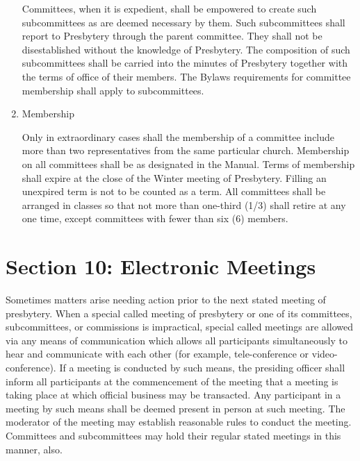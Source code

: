 \documentclass[
]{book}
\begin{document}
\begin{enumerate}
  Committees, when it is expedient, shall be empowered to create such subcommittees as are deemed necessary by them. Such subcommittees shall report to Presbytery through the parent committee. They shall not be disestablished without the knowledge of Presbytery. The composition of such subcommittees shall be carried into the minutes of Presbytery together with the terms of office of their members. The Bylaws requirements for committee membership shall apply to subcommittees.
\item
  Membership

  Only in extraordinary cases shall the membership of a committee include more than two representatives from the same particular church. Membership on all committees shall be as designated in the Manual. Terms of membership shall expire at the close of the Winter meeting of Presbytery. Filling an unexpired term is not to be counted as a term. All committees shall be arranged in classes so that not more than one-third (1/3) shall retire at any one time, except committees with fewer than six (6) members.
\end{enumerate}

\hypertarget{section-10-electronic-meetings}{%
\section*{Section 10: Electronic Meetings}\label{section-10-electronic-meetings}}

Sometimes matters arise needing action prior to the next stated meeting of presbytery. When a special called meeting of presbytery or one of its committees, subcommittees, or commissions is impractical, special called meetings are allowed via any means of communication which allows all participants simultaneously to hear and communicate with each other (for example, tele-conference or video-conference). If a meeting is conducted by such means, the presiding officer shall inform all participants at the commencement of the meeting that a meeting is taking place at which official business may be transacted. Any participant in a meeting by such means shall be deemed present in person at such meeting. The moderator of the meeting may establish reasonable rules to conduct the meeting. Committees and subcommittees may hold their regular stated meetings in this manner, also.
\end{document}
